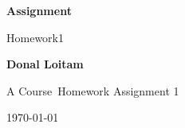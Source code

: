 \documentclass[10pt, a4paper]{article}
\newcommand\course{Course}                      %
\newcommand\hwnumber{1}                         %
\begin{document}
\begin{titlepage}
    \begin{center}
        \vspace*{3cm}
            
        \Huge
        \textbf{Assignment}
            
        \vspace{1cm}
        \huge
        Homework\hwnumber
            
        \vspace{1.5cm}
        \Large
            
        \textbf{Donal Loitam}                      %
        
            
        \vfill
        
        A \course \ Homework Assignment 1
            
        \vspace{1cm}
            
       
       
        
        \Large
        
        \today
            
    \end{center}
\end{titlepage}


\newpage
\begin{Problem}

\end{Problem}
    
\end{document}
